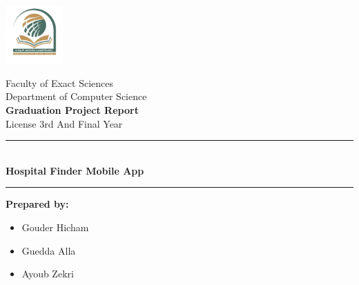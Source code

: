 \documentclass{article}
\begin{document}
\begin{center}
\begin{center}
\begin{minipage}{0.7\textwidth}
		\end{minipage}%
		\hfill
		\begin{minipage}{0.1\textwidth}
			\vspace{1cm}
			\centering
			\includegraphics[width=2.2cm]{images/uni_logo.jpg}
		\end{minipage}
	\end{center}
	\vspace{0.5cm}
	\fontsize{12}{20}\selectfont
	Faculty of Exact Sciences \\
    Department of Computer Science \\
	\vspace{0.5cm}
	\textbf{Graduation Project Report} \\[0.2cm]
	License 3rd And Final Year \\
	\rule{0.85\linewidth}{0.5pt} \\[0.3cm]
	\textbf{\Large Hospital Finder Mobile App}
	\rule{0.85\linewidth}{0.5pt}  \vspace{1cm}
	\begin{flushright}
		\begin{minipage}[t]{0.8\textwidth} %
		\begin{minipage}[t]{0.48\textwidth}
			\hspace*{-1.7cm}
			\textbf{Prepared by:} \\[-4.7ex] 
			\begin{itemize} \setlength\itemsep{0em}
				\setlength\itemsep{0em}
                \setlength{} 
                \setlength{} 
                \item \hspace*{-1.9cm} Gouder Hicham
                \item \hspace*{-1.9cm} Guedda Alla
                \item \hspace*{-1.9cm} Ayoub Zekri
			\end{itemize}
			

\end{minipage}
\end{minipage}
\end{flushright}
\end{center}
\end{document}
